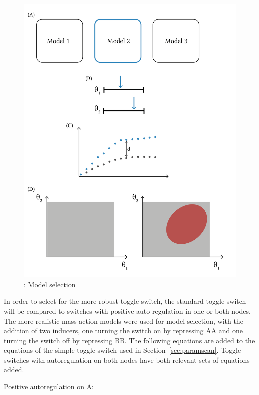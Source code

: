\begin{figure}[htbp]
	\begin{center}
\includegraphics[scale=0.5]{../../chapters/chapterABCSysBio/images/model_selection.png}
\caption[LoF caption]{\label{fig:abc_model_sel}: Model selection}
\end{center}
\end{figure}
\clearpage


In order to select for the more robust toggle switch, the standard toggle switch will be compared to switches with positive auto-regulation in one or both nodes. The more realistic mass action models were used for model selection, with the addition of two inducers, one turning the switch on by repressing AA and one turning the switch off by repressing BB. The following equations are added to the equations of the simple toggle switch used in Section~\ref{sec:paramscan}. Toggle switches with autoregulation on both nodes have both relevant sets of equations added. 

Positive autoregulation on A:


